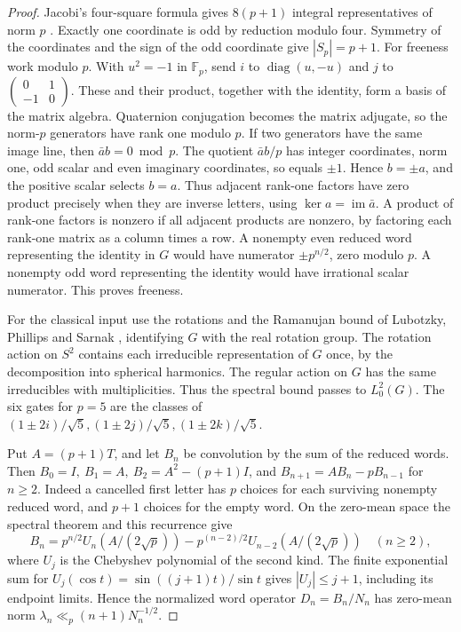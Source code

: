 \documentclass[11pt,reqno]{amsart}
\theoremstyle{definition}
\theoremstyle{remark}
\numberwithin{equation}{section}
\begin{document}
\begin{proof}
Jacobi's four-square formula gives \(8(p+1)\) integral
representatives of norm \(p\) \cite[Ch.~XX]{d4-hw}. Exactly one coordinate
is odd by reduction modulo four. Symmetry of the coordinates and
the sign of the odd coordinate give \(|S_p|=p+1\).
For freeness work modulo \(p\). With \(u^2=-1\) in \(\mathbb F_p\),
send \(i\) to \(\operatorname{diag}(u,-u)\) and \(j\) to
\(\left(\begin{smallmatrix}0&1\\-1&0\end{smallmatrix}\right)\).
These and their product, together with the identity, form a basis
of the matrix algebra. Quaternion conjugation becomes the matrix
adjugate, so the norm-\(p\) generators have rank one modulo \(p\).
If two generators have the same image line, then \(\bar a b=0\bmod p\).
The quotient \(\bar a b/p\) has integer coordinates, norm one,
odd scalar and even imaginary coordinates, so equals \(\pm1\).
Hence \(b=\pm a\), and the positive scalar selects \(b=a\).
Thus adjacent rank-one factors have zero product precisely when
they are inverse letters, using \(\ker a=\operatorname{im}\bar a\).
A product of rank-one factors is nonzero if all adjacent products
are nonzero, by factoring each rank-one matrix as a column times
a row. A nonempty even reduced word representing the identity in
\(G\) would have numerator \(\pm p^{n/2}\), zero modulo \(p\).
A nonempty odd word representing the identity would have
irrational scalar numerator. This proves freeness.

For the classical input use the rotations and the Ramanujan bound of
Lubotzky, Phillips and Sarnak
\cite{m6:LPS,m6:PS}, identifying \(G\) with the real rotation
group. The rotation action on \(S^2\) contains each irreducible
representation of \(G\) once, by the decomposition into spherical
harmonics. The regular action on \(G\) has the same irreducibles
with multiplicities. Thus the spectral bound passes to \(L^2_0(G)\).
The six gates for \(p=5\) are the classes of
\((1\pm2i)/\sqrt5,(1\pm2j)/\sqrt5,(1\pm2k)/\sqrt5\).

Put \(A=(p+1)T\), and let \(B_n\) be convolution by the sum of the
reduced words. Then \(B_0=I,\ B_1=A,\ B_2=A^2-(p+1)I\), and
\(B_{n+1}=AB_n-pB_{n-1}\) for \(n\ge2\). Indeed a cancelled first
letter has \(p\) choices for each surviving nonempty reduced word,
and \(p+1\) choices for the empty word. On the zero-mean space the
spectral theorem and this recurrence give
\[
 B_n=p^{n/2}U_n(A/(2\sqrt p))-p^{(n-2)/2}U_{n-2}(A/(2\sqrt p))
 \quad(n\ge2),
\]
where \(U_j\) is the Chebyshev polynomial of the second kind.
The finite exponential sum for
\(U_j(\cos t)=\sin((j+1)t)/\sin t\) gives \(|U_j|\le j+1\),
including its endpoint limits. Hence the normalized word operator
\(D_n=B_n/N_n\) has zero-mean norm \(\lambda_n\ll_p(n+1)N_n^{-1/2}\).


\end{proof}
\end{document}
